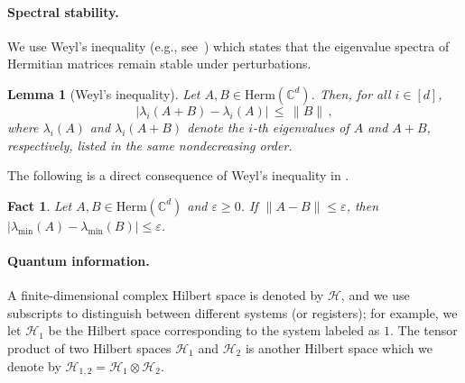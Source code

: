 \documentclass[a4paper,onecolumn,11pt]{quantumarticle}
\theoremstyle{plain}
\newtheorem{lemma}[theorem]{Lemma}
\newtheorem{fact}[theorem]{Fact}
\newcommand{\eps}{\varepsilon}
\begin{document}
\paragraph{Spectral stability.} We use Weyl's inequality (e.g., see~\cite{tao2010eigenvalues}) which states that the eigenvalue spectra of Hermitian matrices remain stable under perturbations.

\begin{lemma}[Weyl's inequality]\label{lem:spectral-stab}
Let $A,B \in \mathrm{Herm}(\mathbb{C}^{d})$. Then, for all $i \in [d]$,
$$
\left|\lambda_i(A+B) - \lambda_i(A) \right| \, \leq \, \|B\| \, ,
$$
where $\lambda_i(A)$ and $\lambda_i(A+B)$ denote the $i$-th eigenvalues of $A$ and $A+B$, respectively, listed in the same nondecreasing order.
\end{lemma}

The following is a direct consequence of Weyl's inequality in .
\begin{fact}\label{fact:weyl-corollary}
Let $A,B \in \mathrm{Herm}(\mathbb{C}^{d})$ and $\eps \geq 0$. If $\|A - B\| \leq \eps$, then $|\lambda_{\mathrm{min}}(A) -\lambda_{\mathrm{min}}(B)| \leq \eps$.
\end{fact}

\paragraph{Quantum information.} 
A finite-dimensional complex Hilbert space is denoted by $\mathcal H$, and we use subscripts to distinguish between different systems (or registers); for example, we let $\mathcal H_{1}$ be the Hilbert space corresponding to the system labeled as $1$. 
The tensor product of two Hilbert spaces $\mathcal H_{1}$ and $\mathcal H_{2}$ is another Hilbert space which we denote by $\mathcal H_{1,2} = \mathcal H_{1} \otimes \mathcal H_{2}$.  
\end{document}
